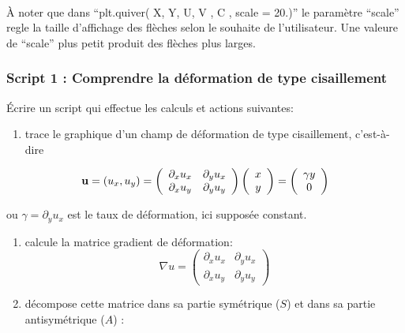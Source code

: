 \documentclass{article}
\begin{document}
    \begin{center}
    \end{center}
    { \hspace*{\fill} \\}
    
    À noter que dans ``plt.quiver( X, Y, U, V , C , scale = 20.)'' le
paramètre ``scale'' regle la taille d'affichage des flèches selon le
souhaite de l'utilisateur. Une valeure de ``scale'' plus petit produit
des flèches plus larges.


    \subsubsection{Script 1 : Comprendre la déformation de type cisaillement}


    Écrire un script qui effectue les calculs et actions suivantes:

\begin{enumerate}
\def\labelenumi{\alph{enumi})}
\itemsep1pt\parskip0pt
\item
  trace le graphique d'un champ de déformation de type cisaillement,
  c'est-à-dire
\end{enumerate}

\[ {\bf u} = (u_x, u_y) = \left( \begin{array}{cc}
\partial_x u_x  & \partial_y u_x \\
\partial_x u_y  & \partial_y u_y \end{array} \right) 
\left( \begin{array}{c}
x   \\
y  \end{array} \right)=  
\left( \begin{array}{c}
\gamma y   \\
0  \end{array} \right)\]

ou \(\gamma = \partial_y u_x\) est le taux de déformation, ici supposée
constant.

\begin{enumerate}
\def\labelenumi{\alph{enumi})}
\setcounter{enumi}{1}
\item
  calcule la matrice gradient de déformation:
  \[ \nabla u =  \left( \begin{array}{cc}
  \partial_x u_x & \partial_y u_x  \\
  \partial_x u_y & \partial_y u_y \end{array} \right) \]
\item
  décompose cette matrice dans sa partie symétrique (\(S\)) et dans sa
  partie antisymétrique (\(A\)) :
\end{enumerate}
\end{document}
